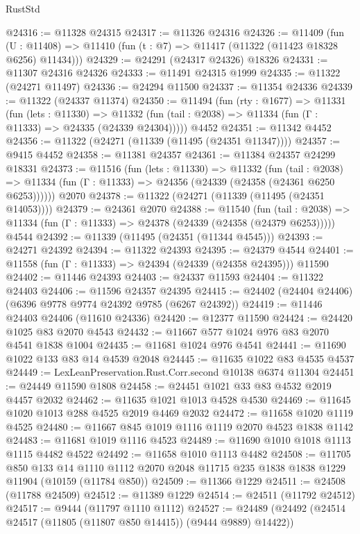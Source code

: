 \begin{lexlean}{RustStd}
\begin{coremodule}
@24316 := @11328 @24315
@24317 := @11326 @24316
@24326 := @11409
    (fun (U : @11408) => @11410 (fun (t : @7) => @11417 (@11322 (@11423 @18328 @6256) @11434)))
@24329 := @24291 (@24317 @24326) @18326
@24331 := @11307 @24316 @24326
@24333 := @11491 @24315 @1999
@24335 := @11322 (@24271 @11497)
@24336 := @24294 @11500
@24337 := @11354 @24336
@24339 := @11322 (@24337 @11374)
@24350 := @11494
    (fun (rty : @1677) =>
    @11331
      (fun (lets : @11330) =>
      @11332 (fun (tail : @2038) => @11334 (fun (Γ : @11333) => @24335 (@24339 @24304)))))
    @4452
@24351 := @11342 @4452
@24356 := @11322 (@24271 (@11339 (@11495 (@24351 @11347))))
@24357 := @9415 @4452
@24358 := @11381 @24357
@24361 := @11384 @24357 @24299 @18331
@24373 := @11516
    (fun (lets : @11330) =>
    @11332
      (fun (tail : @2038) =>
      @11334 (fun (Γ : @11333) => @24356 (@24339 (@24358 (@24361 @6250 @6253))))))
    @2070
@24378 := @11322 (@24271 (@11339 (@11495 (@24351 @14053))))
@24379 := @24361 @2070
@24388 := @11540
    (fun (tail : @2038) => @11334 (fun (Γ : @11333) => @24378 (@24339 (@24358 (@24379 @6253)))))
    @4544
@24392 := @11339 (@11495 (@24351 (@11344 @4545)))
@24393 := @24271 @24392
@24394 := @11322 @24393
@24395 := @24379 @4544
@24401 := @11558 (fun (Γ : @11333) => @24394 (@24339 (@24358 @24395))) @11590
@24402 := @11446 @24393
@24403 := @24337 @11593
@24404 := @11322 @24403
@24406 := @11596 @24357 @24395
@24415 := @24402 (@24404 @24406) (@6396 @9778 @9774 @24392 @9785 (@6267 @24392))
@24419 := @11446 @24403 @24406 (@11610 @24336)
@24420 := @12377 @11590
@24424 := @24420 @1025 @83 @2070 @4543
@24432 := @11667 @577 @1024 @976 @83 @2070 @4541 @1838 @1004
@24435 := @11681 @1024 @976 @4541
@24441 := @11690 @1022 @133 @83 @14 @4539 @2048
@24445 := @11635 @1022 @83 @4535 @4537
@24449 := LexLeanPreservation.Rust.Corr.second @10138 @6374 @11304
@24451 := @24449 @11590 @1808
@24458 := @24451 @1021 @33 @83 @4532 @2019 @4457 @2032
@24462 := @11635 @1021 @1013 @4528 @4530
@24469 := @11645 @1020 @1013 @288 @4525 @2019 @4469 @2032
@24472 := @11658 @1020 @1119 @4525
@24480 := @11667 @845 @1019 @1116 @1119 @2070 @4523 @1838 @1142
@24483 := @11681 @1019 @1116 @4523
@24489 := @11690 @1010 @1018 @1113 @1115 @4482 @4522
@24492 := @11658 @1010 @1113 @4482
@24508 := @11705
    @850
    @133
    @14
    @1110
    @1112
    @2070
    @2048
    @11715
    @235
    @1838
    @1838
    @1229
    @11904
    (@10159 (@11784 @850))
@24509 := @11366 @1229
@24511 := @24508 (@11788 @24509)
@24512 := @11389 @1229
@24514 := @24511 (@11792 @24512)
@24517 := @9444 (@11797 @1110 @1112)
@24527 := @24489 (@24492 (@24514 @24517 (@11805 (@11807 @850 @14415)) (@9444 @9889) @14422))

\end{coremodule}
\end{lexlean}

